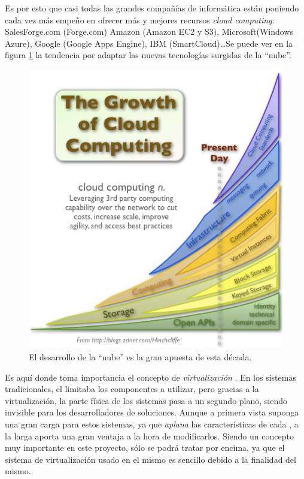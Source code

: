 Es por esto que casi todas las grandes compañías de informática están
poniendo cada vez más empeño en ofrecer más y mejores recursos 
\emph{cloud computing}: SalesForge.com (Forge.com) Amazon (Amazon EC2 y 
S3), Microsoft(Windows Azure), Google (Google Apps Engine), IBM 
(SmartCloud)\ldots Se puede ver en la figura \ref{fig:eCloudComputing} 
la tendencia por adaptar las nuevas tecnologías surgidas de la 
``nube''.

\begin{figure}[h]
	\centering
	\includegraphics[scale=0.6]{images/eCloudComputing.png}
	\caption[Evolución de la ``nube'']{El desarrollo de la ``nube'' es la gran apuesta de esta 
	década.}
	\label{fig:eCloudComputing}
\end{figure}

Es aquí donde toma importancia el concepto de \emph{virtualización} . 
En los sistemas tradicionales, el \hardware limitaba los componentes 
\software a utilizar, pero gracias a la virtualización, la parte 
física de los sistemas pasa a un segundo plano, siendo invisible para 
los desarrolladores de soluciones. Aunque a primera vista suponga una 
gran carga para estos sistemas, ya que \emph{aplana} las características 
de cada \hardware , a la larga aporta una gran ventaja a la hora de 
modificarlos. Siendo un concepto muy importante en este 
proyecto, sólo se podrá tratar por encima, ya que el sistema de 
virtualización usado en el mismo es sencillo debido a la finalidad del 
mismo.

